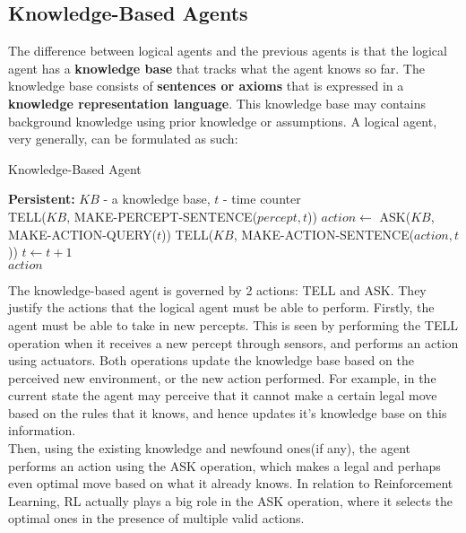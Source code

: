 \documentclass[12pt]{article}
\begin{document}
\subsection{Knowledge-Based Agents}

The difference between logical agents and the previous agents is that the logical agent has a \textbf{knowledge base} that tracks what the agent knows so far. The knowledge base consists of \textbf{sentences or axioms} that is expressed in a \textbf{knowledge representation language}. This knowledge base may contains background knowledge using prior knowledge or assumptions. A logical agent, very generally, can be formulated as such:

\begin{algorithm}
\caption{Knowledge-Based Agent}\label{euclid}
\begin{algorithmic}[1]
\State \textbf{Persistent:} $KB$ - a knowledge base, $t$ - time counter
\\
\State \textsc{TELL}($KB$, \textsc{MAKE-PERCEPT-SENTENCE($percept, t$)})
\State $action \leftarrow$ \textsc{ASK}($KB$, \textsc{MAKE-ACTION-QUERY($t$)})
\State \textsc{TELL}($KB$, \textsc{MAKE-ACTION-SENTENCE($action, t$)})
\State $t \leftarrow t + 1$
\\
\Return $action$
\end{algorithmic}
\end{algorithm}

The knowledge-based agent is governed by 2 actions: \textsc{TELL} and \textsc{ASK}. They justify the actions that the logical agent must be able to perform. Firstly, the agent must be able to take in new percepts. This is seen by performing the \textsc{TELL} operation when it receives a new percept through sensors, and performs an action using actuators. Both operations update the knowledge base based on the perceived new environment, or the new action performed. For example, in the current state the agent may perceive that it cannot make a certain legal move based on the rules that it knows, and hence updates it's knowledge base on this information.\\

Then, using the existing knowledge and newfound ones(if any), the agent performs an action using the \textsc{ASK} operation, which makes a legal and perhaps even optimal move based on what it already knows. In relation to Reinforcement Learning, RL actually plays a big role in the \textsc{ASK} operation, where it selects the optimal ones in the presence of multiple valid actions.\\
\end{document}
